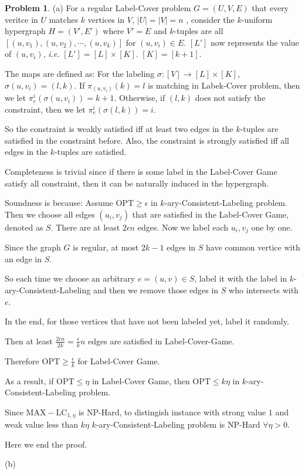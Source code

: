 \documentclass[a4paper]{article}
\theoremstyle{definition}
\newtheorem{problem}{Problem}
\theoremstyle{plain}
\newcommand{\<}{\left<}
\renewcommand{\>}{\right>}
\newcommand{\OPT}{\mathrm{OPT}}
\numberwithin{equation}{problem}
\newcommand{\ie}{ \textit{ i.e. } }
\begin{document}
\begin{problem}
    (a) For a regular Label-Cover problem  $ G=(U,V,E) $ that every veritce in  $ U $ matches  $ k $ vertices in  $ V $,  $ |U|=|V|=n $ , consider the  $ k $-uniform hypergraph  $ H=(V',E') $ where  $ V'=E $ and  $ k $-tuples are all  $ [(u,v_1),(u,v_2),\cdots,(u,v_k)] $ for  $  (u,v_i)\in E   $.  $ [L'] $ now represents the value of $ (u,v_i) $, \ie    $ [L']=[L]\times [K] $.  $ [K]=[k+1] $. 
    
    The maps are defined as: For the labeling  $ \sigma:[V]\rightarrow[L]\times [K] $,  $ \sigma(u,v_i)=(l,k) $. If  $ \pi_{(u,v_i)}(k)=l $ is matching in Labek-Cover problem, then we let  $ \pi_e^i(\sigma(u,v_i))=k+1 $. Otherwise, if  $ (l,k) $ does not satisfy the constraint, then we let  $ \pi_e^i(\sigma(l,k))=i $.
    
    So the constraint is weakly satisfied iff at least two edges in the  $ k $-tuples are satisfied in the constraint before. Also, the constraint is strongly satisfied iff all edges in the  $ k $-tuples are satisfied.
    
    Completeness is trivial since if there is some label in the Label-Cover Game satisfy all constraint, then it can be naturally induced in the hypergraph.

    Soundness is because: Assume  $ \OPT \geq \epsilon $ in  $ k $-ary-Consistent-Labeling problem. Then we choose all edges  $ (u_i,v_j) $ that are satisfied in  the Label-Cover Game, denoted as  $ S $. There are at least  $ 2\epsilon n $ edges. Now we label each  $ u_i,v_j $ one by one.

    Since the graph  $ G $ is regular, at most  $ 2k-1 $   edges in  $ S $ have common vertice with an edge in  $ S $.
    
    So each time we choose an arbitrary  $ e=(u,v)\in S $, label it with the label in  $ k $-ary-Consistent-Labeling and then we remove those edges in  $ S $ who intersects with  $ e $.
    
    In the end, for those vertices that have not been labeled yet, label it randomly.

    Then at least  $ \frac{2\epsilon n}{2k}=\frac{\epsilon }{k}n $ edges are satisfied in Label-Cover-Game.
    
    Therefore  $ \OPT \geq \frac{\epsilon}{k} $ for Label-Cover Game.
    
    As a result, if  $ \OPT \leq \eta $ in Label-Cover Game, then  $ \OPT \leq k\eta $ in  $ k $-ary-Consistent-Labeling problem.
    
    Since  $ \mathrm{MAX-LC}_{1,\eta} $ is NP-Hard, to distingish instance with strong value $ 1 $ and weak value less than  $ k\eta $  $ k $-ary-Consistent-Labeling problem is NP-Hard  $ \forall \eta>0 $.
    
    Here we end the proof.

    (b)



\end{problem}
\end{document}
